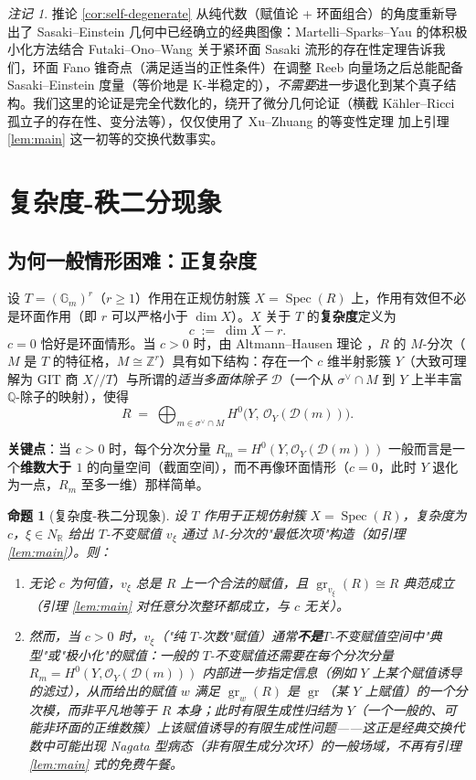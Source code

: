 \documentclass[11pt,a4paper]{article}
\newtheorem{proposition}[theorem]{命题}
\theoremstyle{definition}
\theoremstyle{remark}
\newtheorem{remark}[theorem]{注记}
\DeclareMathOperator{\Spec}{Spec}
\DeclareMathOperator{\gr}{gr}
\newcommand{\Q}{\mathbb{Q}}
\newcommand{\Z}{\mathbb{Z}}
\newcommand{\R}{\mathbb{R}}
\newcommand{\Gm}{\mathbb{G}_m}
\begin{document}
\begin{remark}
推论 \ref{cor:self-degenerate} 从纯代数（赋值论 + 环面组合）的角度重新导出了 Sasaki--Einstein 几何中已经确立的经典图像：Martelli--Sparks--Yau \cite{MSY2008} 的体积极小化方法结合 Futaki--Ono--Wang \cite{FOW2009} 关于紧环面 Sasaki 流形的存在性定理告诉我们，环面 Fano 锥奇点（满足适当的正性条件）在调整 Reeb 向量场之后总能配备 Sasaki--Einstein 度量（等价地是 K-半稳定的），\emph{不需要}进一步退化到某个真子结构。我们这里的论证是完全代数化的，绕开了微分几何论证（横截 Kähler--Ricci 孤立子的存在性、变分法等），仅仅使用了 Xu--Zhuang 的等变性定理 \cite{XZ2021} 加上引理 \ref{lem:main} 这一初等的交换代数事实。
\end{remark}

\section{复杂度-秩二分现象}

\subsection{为何一般情形困难：正复杂度}

设 $T=(\Gm)^r$（$r\ge1$）作用在正规仿射簇 $X=\Spec(R)$ 上，作用有效但不必是环面作用（即 $r$ 可以严格小于 $\dim X$）。$X$ 关于 $T$ 的\textbf{复杂度}定义为
\[
c \;:=\; \dim X - r.
\]
$c=0$ 恰好是环面情形。当 $c>0$ 时，由 Altmann--Hausen 理论 \cite{AH2006}，$R$ 的 $M$-分次（$M$ 是 $T$ 的特征格，$M\cong\Z^r$）具有如下结构：存在一个 $c$ 维半射影簇 $Y$（大致可理解为 GIT 商 $X/\!\!/T$）与所谓的\emph{适当多面体除子} $\mathcal D$（一个从 $\sigma^\vee\cap M$ 到 $Y$ 上半丰富 $\Q$-除子的映射），使得
\[
R \;=\; \bigoplus_{m\in\sigma^\vee\cap M} H^0\big(Y,\, \mathcal O_Y(\mathcal D(m))\big).
\]

\textbf{关键点}：当 $c>0$ 时，每个分次分量 $R_m=H^0(Y,\mathcal O_Y(\mathcal D(m)))$ 一般而言是一个\textbf{维数大于 $1$} 的向量空间（截面空间），而不再像环面情形（$c=0$，此时 $Y$ 退化为一点，$R_m$ 至多一维）那样简单。

\begin{proposition}[复杂度-秩二分现象]\label{prop:dichotomy}
设 $T$ 作用于正规仿射簇 $X=\Spec(R)$，复杂度为 $c$，$\xi\in N_\R$ 给出 $T$-不变赋值 $v_\xi$ 通过 $M$-分次的"最低次项"构造（如引理 \ref{lem:main}）。则：
\begin{enumerate}[label=(\arabic*)]
  \item 无论 $c$ 为何值，$v_\xi$ 总是 $R$ 上一个合法的赋值，且 $\gr_{v_\xi}(R)\cong R$ 典范成立（引理 \ref{lem:main} 对任意分次整环都成立，与 $c$ 无关）。
  \item 然而，当 $c>0$ 时，$v_\xi$（"纯 $T$-次数"赋值）通常\textbf{不是}$T$-不变赋值空间中"典型"或"极小化"的赋值：一般的 $T$-不变赋值还需要在每个分次分量 $R_m=H^0(Y,\mathcal O_Y(\mathcal D(m)))$ 内部\emph{进一步}指定信息（例如 $Y$ 上某个赋值诱导的滤过），从而给出的赋值 $w$ 满足 $\gr_w(R)$ 是 $\gr$（某 $Y$ 上赋值）的一个\emph{分次模}，而非平凡地等于 $R$ 本身；此时有限生成性归结为 $Y$（一个一般的、可能非环面的正维数簇）上该赋值诱导的有限生成性问题——这正是经典交换代数中可能出现 Nagata 型病态（非有限生成分次环）的一般场域，不再有引理 \ref{lem:main} 式的免费午餐。
\end{enumerate}
\end{proposition}
\end{document}
